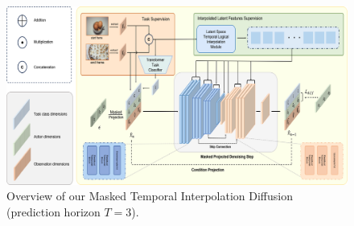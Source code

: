\begin{figure}[t]
    \centering
    \includegraphics[width=\textwidth,height=0.6\textheight,keepaspectratio]{figures/architecture1.png}
    \caption{Overview of our Masked Temporal Interpolation Diffusion (prediction horizon \( T=3 \)). }
    \label{fig:architecture}
\vspace{-4mm}
\end{figure}
